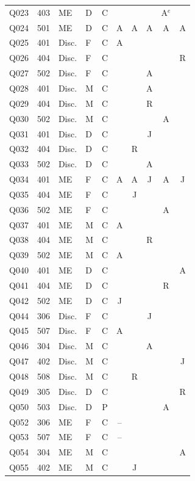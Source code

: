 {\begin{longtable}{llllcccccc}
Q023 & 403 & ME & D & C &  &  &  & A$^{e}$ &  \\
Q024 & 501 & ME & D & C & A & A & A & A & A \\
Q025 & 401 & Disc. & F & C & A &  &  &  &  \\
Q026 & 404 & Disc. & F & C &  &  &  &  & R \\
Q027 & 502 & Disc. & F & C &  &  & A &  &  \\
Q028 & 401 & Disc. & M & C &  &  & A &  &  \\
Q029 & 404 & Disc. & M & C &  &  & R &  &  \\
Q030 & 502 & Disc. & M & C &  &  &  & A &  \\
Q031 & 401 & Disc. & D & C &  &  & J &  &  \\
Q032 & 404 & Disc. & D & C &  & R &  &  &  \\
Q033 & 502 & Disc. & D & C &  &  & A &  &  \\
Q034 & 401 & ME & F & C & A & A & J & A & J \\
Q035 & 404 & ME & F & C &  & J &  &  &  \\
Q036 & 502 & ME & F & C &  &  &  & A &  \\
Q037 & 401 & ME & M & C & A &  &  &  &  \\
Q038 & 404 & ME & M & C &  &  & R &  &  \\
Q039 & 502 & ME & M & C & A &  &  &  &  \\
Q040 & 401 & ME & D & C &  &  &  &  & A \\
Q041 & 404 & ME & D & C &  &  &  & R &  \\
Q042 & 502 & ME & D & C & J &  &  &  &  \\
Q044 & 306 & Disc. & F & C &  &  & J &  &  \\
Q045 & 507 & Disc. & F & C & A &  &  &  &  \\
Q046 & 304 & Disc. & M & C &  &  & A &  &  \\
Q047 & 402 & Disc. & M & C &  &  &  &  & J \\
Q048 & 508 & Disc. & M & C &  & R &  &  &  \\
Q049 & 305 & Disc. & D & C &  &  &  &  & R \\
Q050 & 503 & Disc. & D & P &  &  &  & A &  \\
Q052 & 306 & ME & F & C & -- &  &  &  &  \\
Q053 & 507 & ME & F & C & -- &  &  &  &  \\
Q054 & 304 & ME & M & C &  &  &  &  & A \\
Q055 & 402 & ME & M & C &  & J &  &  &  \\

\end{longtable}}
